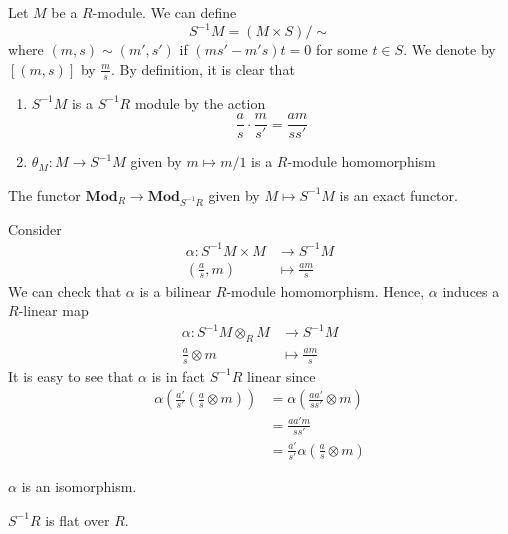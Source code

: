 \documentclass[oneside, 12pt]{scrbook}
\theoremstyle{theorem}
\begin{document}
Let $M$ be a $R$-module. We can define $$S^{-1}M = (M \times S)/ \sim$$ where $(m,s) \sim (m',s')$ if $(ms'-m's)t=0$ for some $t \in S$. We denote by $[(m,s)]$ by $\frac{m}{s}$. By definition, it is clear that 
\begin{enumerate}
\item $S^{-1}M$ is a $S^{-1}R$ module by the action $$\frac{a}{s} \cdot \frac{m}{s'} = \frac{am}{ss'}$$
\item $\theta_{M}: M \rightarrow S^{-1}M$ given by $m \mapsto m/1$ is a $R$-module homomorphism
\end{enumerate}

\begin{proposition}
The functor $\mathbf{Mod}_{R} \rightarrow \mathbf{Mod}_{S^{-1}R}$ given by $M \mapsto S^{-1}M$ is an exact functor.
\end{proposition}

Consider \begin{align*}
\alpha : S^{-1}M \times M &\rightarrow S^{-1}M \\
(\frac{a}{s},m) &\mapsto \frac{am}{s}
\end{align*}
We can check that $\alpha$ is a bilinear $R$-module homomorphism. Hence, $\alpha$ induces a $R$-linear map 
\begin{align*}
\alpha : S^{-1}M \otimes_{R} M &\rightarrow S^{-1}M \\
\frac{a}{s}\otimes m &\mapsto \frac{am}{s}
\end{align*}
It is easy to see that $\alpha$ is in fact $S^{-1}R$ linear since 
\begin{align*}
\alpha \left( \frac{a'}{s'} \left( \frac{a}{s} \otimes m \right) \right) &= \alpha \left(\frac{aa'}{ss'} \otimes m \right) \\
&= \frac{aa'm}{ss'}\\
&= \frac{a'}{s'} \alpha \left( \frac{a}{s} \otimes m \right)
\end{align*}

\begin{theorem}
$\alpha$ is an isomorphism.
\end{theorem}

\begin{corollary}
$S^{-1}R$ is flat over $R$.
\end{corollary}
\end{document}
